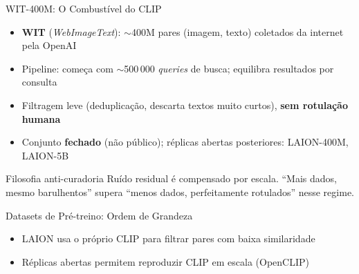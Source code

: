 \documentclass[aspectratio=169,xcolor=dvipsnames]{beamer}
\begin{document}
  \begin{frame}{WIT-400M: O Combustível do CLIP}
    \begin{itemize}
      \item \textbf{WIT} (\textit{WebImageText}): $\sim$400M pares (imagem, texto) coletados da internet pela OpenAI
      \item Pipeline: começa com $\sim$500\,000 \textit{queries} de busca; equilibra resultados por consulta
      \item Filtragem leve (deduplicação, descarta textos muito curtos), \textbf{sem rotulação humana}
      \item Conjunto \textbf{fechado} (não público); réplicas abertas posteriores: LAION-400M, LAION-5B
    \end{itemize}

    \vspace{0.5em}
    \begin{block}{Filosofia anti-curadoria}
      Ruído residual é compensado por escala. ``Mais dados, mesmo barulhentos'' supera
      ``menos dados, perfeitamente rotulados'' nesse regime.
    \end{block}
  \end{frame}

  \begin{frame}{Datasets de Pré-treino: Ordem de Grandeza}
    \centering

    \vspace{0.5em}
    \begin{itemize}\setlength{\itemsep}{0pt}
      \item LAION usa o próprio CLIP para filtrar pares com baixa similaridade
      \item Réplicas abertas permitem reproduzir CLIP em escala (OpenCLIP)
    \end{itemize}
  \end{frame}
\end{document}
